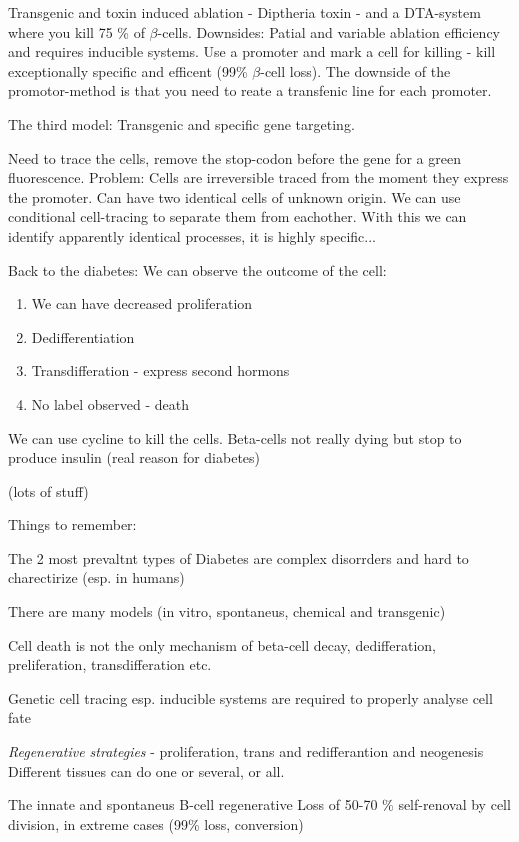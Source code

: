 \documentclass[12p]{article}
\begin{document}
Transgenic and toxin induced ablation - Diptheria toxin - and a DTA-system where you kill 75 \% of $\beta$-cells.
Downsides: Patial and variable ablation efficiency and requires inducible systems.
Use a promoter and mark a cell for killing - kill exceptionally specific and efficent (99\% $\beta$-cell loss).
The downside of the promotor-method is that you need to reate a transfenic line for each promoter.

The third model: Transgenic and specific gene targeting.

Need to trace the cells, remove the stop-codon before the gene for a green fluorescence.
Problem: Cells are irreversible traced from the moment they express the promoter.
Can have two identical cells of unknown origin.
We can use conditional cell-tracing to separate them from eachother.
With this we can identify apparently identical processes, it is highly specific...

Back to the diabetes:
We can observe the outcome of the cell:

\begin{enumerate}
	\item
	    We can have decreased proliferation
	\item
	    Dedifferentiation
	\item
	    Transdifferation - express second hormons
	\item
	    No label observed - death
\end{enumerate}

We can use cycline to kill the cells.
Beta-cells not really dying but stop to produce insulin (real reason for diabetes)

(lots of stuff)

Things to remember:

The 2 most prevaltnt types of Diabetes are complex disorrders and hard to charectirize (esp. in humans)

There are many models (in vitro, spontaneus, chemical and transgenic)

Cell death is not the only mechanism of beta-cell decay, dedifferation, preliferation, transdifferation etc.

Genetic cell tracing esp. inducible systems are required to properly analyse cell fate

\emph{Regenerative strategies} - proliferation, trans and redifferantion and neogenesis
Different tissues can do one or several, or all.

The innate and spontaneus B-cell regenerative
Loss of 50-70 \% self-renoval by cell division, in extreme cases (99\% loss, conversion)
\end{document}
